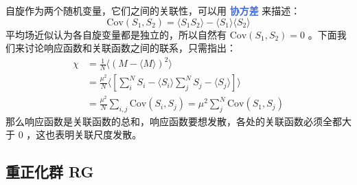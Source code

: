 自旋作为两个随机变量，它们之间的关联性，可以用 \textcolor{RoyalBlue}{\textbf{\kaishu 协方差}} 来描述：
\begin{equation}
    \text{Cov}(S_1,S_2) = \langle S_1 S_2 \rangle - \langle S_1 \rangle \langle S_2 \rangle
\end{equation}
平均场近似认为各自旋变量都是独立的，所以自然有 $\text{Cov}(S_1,S_2) = 0$ 。下面我们来讨论响应函数和关联函数之间的联系，只需指出：
\begin{equation}
    \begin{aligned}
        \chi &= \frac{1}{N} \langle (M-\langle M \rangle)^2 \rangle \\
        &= \frac{\mu^2}{N}\langle \left[\sum_i^N S_i - \langle S_i \rangle\sum_j^N S_j - \langle S_j \rangle\right] \rangle \\
        &= \frac{\mu^2}{N} \sum_{i,j}\text{Cov}(S_i,S_j) = \mu^2 \sum_{j}^N\text{Cov}(S_1,S_j)
    \end{aligned}
\end{equation}
那么响应函数是关联函数的总和，响应函数要想发散，各处的关联函数必须全都大于 $0$ ，这也表明关联尺度发散。

\subsection{重正化群 RG}